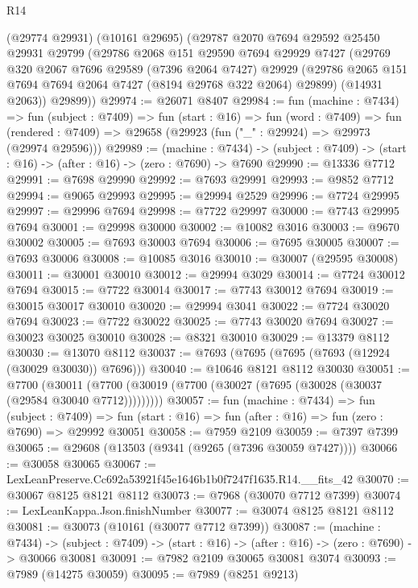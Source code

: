 \begin{lexlean}{R14}
\begin{coremodule}
    (@29774 @29931)
    (@10161 @29695)
    (@29787
      @2070
      @7694
      @29592
      @25450
      @29931
      @29799
      (@29786
        @2068
        @151
        @29590
        @7694
        @29929
        @7427
        (@29769
          @320
          @2067
          @7696
          @29589
          (@7396 @2064 @7427)
          @29929
          (@29786 @2065 @151 @7694 @7694 @2064 @7427 (@8194 @29768 @322 @2064) @29899)
          (@14931 @2063))
        @29899))
@29974 := @26071 @8407
@29984 := fun (machine : @7434) =>
  fun (subject : @7409) =>
  fun (start : @16) =>
  fun (word : @7409) =>
  fun (rendered : @7409) => @29658 (@29923 (fun ("_" : @29924) => @29973 (@29974 @29596)))
@29989 := (machine : @7434) ->
  (subject : @7409) -> (start : @16) -> (after : @16) -> (zero : @7690) -> @7690
@29990 := @13336 @7712
@29991 := @7698 @29990
@29992 := @7693 @29991
@29993 := @9852 @7712
@29994 := @9065 @29993
@29995 := @29994 @2529
@29996 := @7724 @29995
@29997 := @29996 @7694
@29998 := @7722 @29997
@30000 := @7743 @29995 @7694
@30001 := @29998 @30000
@30002 := @10082 @3016
@30003 := @9670 @30002
@30005 := @7693 @30003 @7694
@30006 := @7695 @30005
@30007 := @7693 @30006
@30008 := @10085 @3016
@30010 := @30007 (@29595 @30008)
@30011 := @30001 @30010
@30012 := @29994 @3029
@30014 := @7724 @30012 @7694
@30015 := @7722 @30014
@30017 := @7743 @30012 @7694
@30019 := @30015 @30017 @30010
@30020 := @29994 @3041
@30022 := @7724 @30020 @7694
@30023 := @7722 @30022
@30025 := @7743 @30020 @7694
@30027 := @30023 @30025 @30010
@30028 := @8321 @30010
@30029 := @13379 @8112
@30030 := @13070 @8112
@30037 := @7693 (@7695 (@7695 (@7693 (@12924 (@30029 @30030)) @7696)))
@30040 := @10646 @8121 @8112 @30030
@30051 := @7700
    (@30011 (@7700 (@30019 (@7700 (@30027 (@7695 (@30028 (@30037 (@29584 @30040 @7712)))))))))
@30057 := fun (machine : @7434) =>
  fun (subject : @7409) =>
  fun (start : @16) => fun (after : @16) => fun (zero : @7690) => @29992 @30051
@30058 := @7959 @2109
@30059 := @7397 @7399
@30065 := @29608 (@13503 (@9341 (@9265 (@7396 @30059 @7427))))
@30066 := @30058 @30065
@30067 := LexLeanPreserve.Cc692a53921f45e1646b1b0f7247f1635.R14.__fits_42
@30070 := @30067 @8125 @8121 @8112
@30073 := @7968 (@30070 @7712 @7399)
@30074 := LexLeanKappa.Json.finishNumber
@30077 := @30074 @8125 @8121 @8112
@30081 := @30073 (@10161 (@30077 @7712 @7399))
@30087 := (machine : @7434) ->
  (subject : @7409) -> (start : @16) -> (after : @16) -> (zero : @7690) -> @30066 @30081
@30091 := @7982 @2109 @30065 @30081 @3074
@30093 := @7989 (@14275 @30059)
@30095 := @7989 (@8251 @9213)

\end{coremodule}
\end{lexlean}
